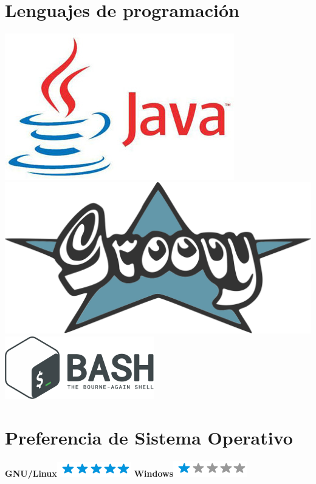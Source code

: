 \documentclass[]{friggeri-cv}
\begin{document}
\newpage
\begin{aside}
    ~
    ~
    \section{Lenguajes de programaci\'on}
    \includegraphics[scale=0.20]{img/java}
    \includegraphics[scale=0.07]{img/groovy}
    \includegraphics[scale=0.3]{img/bash}
    ~
    ~
    \section{Preferencia de Sistema Operativo}
    \textbf{GNU/Linux}\includegraphics[scale=0.40]{img/5stars.png}
    \textbf{Windows}\includegraphics[scale=0.40]{img/1stars.png}
    ~

\end{aside}
\end{document}
